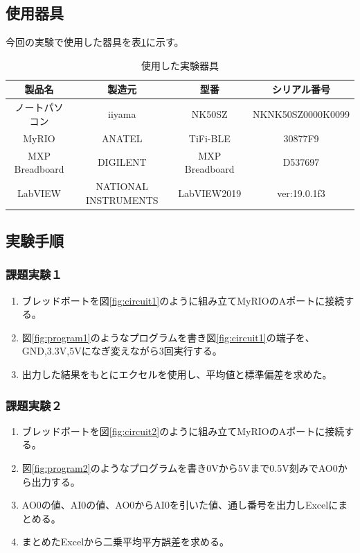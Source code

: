 \documentclass[11pt,dvipdfmx]{jarticle}
\begin{document}
\subsection{使用器具}
今回の実験で使用した器具を表\ref{tab:tools}に示す。
\begin{table}[hbtp]
	\caption{使用した実験器具}
	\label{tab:tools}
	\centering
	\begin{tabular}{|c|c|c|c|}
		\hline
		製品名　& 製造元　& 型番 & シリアル番号\\
		\hline \hline
		ノートパソコン & iiyama &NK50SZ& NKNK50SZ0000K0099\\
		\hline
		MyRIO & ANATEL &TiFi-BLE& 30877F9\\
		\hline
		MXP Breadboard & DIGILENT &MXP Breadboard& D537697\\
		\hline
		LabVIEW & NATIONAL INSTRUMENTS &LabVIEW2019& ver:19.0.1f3\\
		\hline
	\end{tabular}
	
\end{table}

\subsection{実験手順}
	\subsubsection{課題実験１}
		\begin{enumerate}
			\item ブレッドボートを図\ref{fig:circuit1}のように組み立てMyRIOのAポートに接続する。
			\item 図\ref{fig:program1}のようなプログラムを書き図\ref{fig:circuit1}の端子を、GND,3.3V,5Vになぎ変えながら3回実行する。
			\item 出力した結果をもとにエクセルを使用し、平均値と標準偏差を求めた。
		\end{enumerate}

	\subsubsection{課題実験２}
		\begin{enumerate}
			\item ブレッドボートを図\ref{fig:circuit2}のように組み立てMyRIOのAポートに接続する。
			\item 図\ref{fig:program2}のようなプログラムを書き0Vから5Vまで0.5V刻みでAO0から出力する。
			\item AO0の値、AI0の値、AO0からAI0を引いた値、通し番号を出力しExcelにまとめる。
			\item まとめたExcelから二乗平均平方誤差を求める。
		\end{enumerate}
		\newpage
\end{document}

